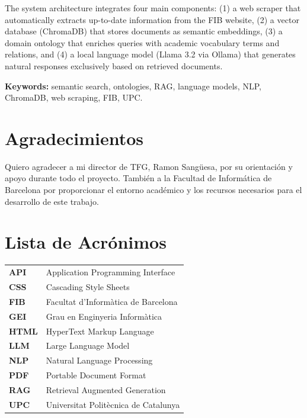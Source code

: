 \documentclass[12pt, a4paper, twoside]{report}
\begin{document}
The system architecture integrates four main components: (1) a web scraper that automatically extracts up-to-date information from the FIB website, (2) a vector database (ChromaDB) that stores documents as semantic embeddings, (3) a domain ontology that enriches queries with academic vocabulary terms and relations, and (4) a local language model (Llama 3.2 via Ollama) that generates natural responses exclusively based on retrieved documents.

\textbf{Keywords:} semantic search, ontologies, RAG, language models, NLP, ChromaDB, web scraping, FIB, UPC.

\chapter*{Agradecimientos}

Quiero agradecer a mi director de TFG, Ramon Sang\"uesa, por su orientaci\'on y apoyo durante todo el proyecto. Tambi\'en a la Facultad de Inform\'atica de Barcelona por proporcionar el entorno acad\'emico y los recursos necesarios para el desarrollo de este trabajo.

\tableofcontents
\listoffigures
\listoftables

\chapter*{Lista de Acr\'onimos}

\begin{tabular}{ll}
\textbf{API} & Application Programming Interface \\
\textbf{CSS} & Cascading Style Sheets \\
\textbf{FIB} & Facultat d'Inform\`atica de Barcelona \\
\textbf{GEI} & Grau en Enginyeria Inform\`atica \\
\textbf{HTML} & HyperText Markup Language \\
\textbf{LLM} & Large Language Model \\
\textbf{NLP} & Natural Language Processing \\
\textbf{PDF} & Portable Document Format \\
\textbf{RAG} & Retrieval Augmented Generation \\
\textbf{UPC} & Universitat Polit\`ecnica de Catalunya \\
\end{tabular}
\end{document}
